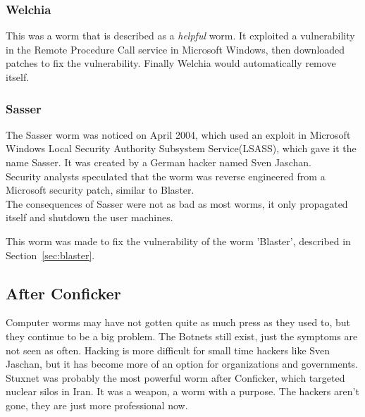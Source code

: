 \documentclass{article}
\numberwithin{equation}{section} %
\numberwithin{figure}{section} %
\numberwithin{table}{section} %
\begin{document}
\subsubsection{Welchia}
This was a worm that is described as a \textit{helpful} worm.  It exploited a vulnerability in the Remote Procedure Call service in Microsoft Windows, then downloaded patches to fix the vulnerability.  Finally Welchia would automatically remove itself.\\

\subsubsection{Sasser}
The Sasser worm was noticed on April 2004, which used an exploit in Microsoft Windows Local Security Authority Subsystem Service(LSASS), which gave it the name Sasser.  It was created by a German hacker named Sven Jaschan.  \\

Security analysts speculated that the worm was reverse engineered from a Microsoft security patch, similar to Blaster. \\

The consequences of Sasser were not as bad as most worms, it only propagated itself and shutdown the user machines.

This worm was made to fix the vulnerability of the worm 'Blaster', described in Section~\ref{sec:blaster}.

\subsection{After Conficker}
Computer worms may have not gotten quite as much press as they used to, but they continue to be a big problem.  The Botnets still exist, just the symptoms are not seen as often.  Hacking is more difficult for small time hackers like Sven Jaschan, but it has become more of an option for organizations and governments. \\

Stuxnet was probably the most powerful worm after Conficker, which targeted nuclear silos in Iran.  It was a weapon, a worm with a purpose.  The hackers aren't gone, they are just more professional now.  

 

\end{document}
